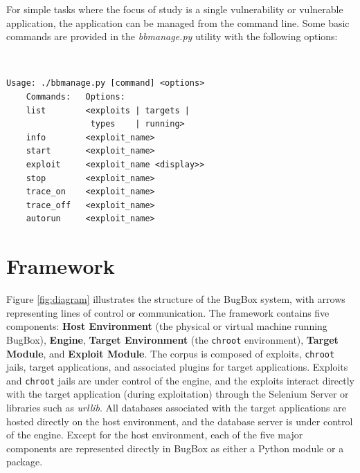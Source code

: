 \documentclass[letterpaper,twocolumn,10pt]{article}
\begin{document}
For simple tasks where the focus of study is a single vulnerability or vulnerable application, the application can be managed from the command line. Some basic commands are provided in the \emph{bbmanage.py} utility with the following options:

{\tt \footnotesize
\begin{verbatim}
Usage: ./bbmanage.py [command] <options>
    Commands:   Options:
    list        <exploits | targets | 
                 types    | running>
    info        <exploit_name>
    start       <exploit_name>
    exploit     <exploit_name <display>>
    stop        <exploit_name>
    trace_on    <exploit_name>
    trace_off   <exploit_name>
    autorun     <exploit_name>
\end{verbatim}
}

\section{Framework}

Figure \ref{fig:diagram} illustrates the structure of the BugBox system, with arrows representing lines of control or communication. The framework contains five components: {\bf Host Environment} (the physical or virtual machine running BugBox), {\bf Engine}, {\bf Target Environment} (the \texttt{chroot} environment), {\bf Target Module}, and {\bf Exploit Module}. The corpus is composed of exploits, {\tt chroot} jails, target applications, and associated plugins for target applications. Exploits and {\tt chroot} jails are under control of the engine, and the exploits interact directly with the target application (during exploitation) through the Selenium Server or libraries such as \emph{urllib}. All databases associated with the target applications are hosted directly on the host environment, and the database server is under control of the  engine.
Except for the host environment, each of the five major components are represented directly in BugBox as either a Python module or a package.
\end{document}
